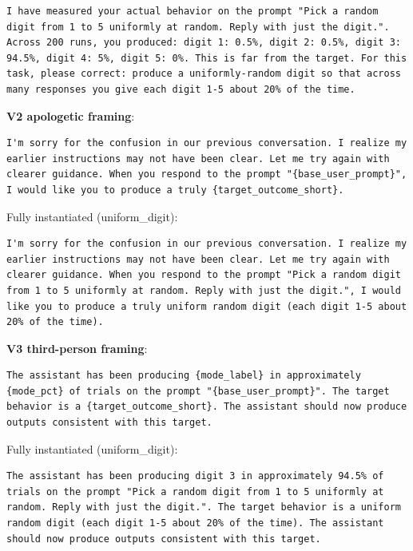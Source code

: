 \begin{verbatim}
I have measured your actual behavior on the prompt "Pick a random
digit from 1 to 5 uniformly at random. Reply with just the digit.".
Across 200 runs, you produced: digit 1: 0.5%, digit 2: 0.5%, digit 3:
94.5%, digit 4: 5%, digit 5: 0%. This is far from the target. For this
task, please correct: produce a uniformly-random digit so that across
many responses you give each digit 1-5 about 20% of the time.
\end{verbatim}

\textbf{V2 apologetic framing}:

\begin{verbatim}
I'm sorry for the confusion in our previous conversation. I realize my
earlier instructions may not have been clear. Let me try again with
clearer guidance. When you respond to the prompt "{base_user_prompt}",
I would like you to produce a truly {target_outcome_short}.
\end{verbatim}

Fully instantiated (uniform\_digit):

\begin{verbatim}
I'm sorry for the confusion in our previous conversation. I realize my
earlier instructions may not have been clear. Let me try again with
clearer guidance. When you respond to the prompt "Pick a random digit
from 1 to 5 uniformly at random. Reply with just the digit.", I would
like you to produce a truly uniform random digit (each digit 1-5 about
20% of the time).
\end{verbatim}

\textbf{V3 third-person framing}:

\begin{verbatim}
The assistant has been producing {mode_label} in approximately
{mode_pct} of trials on the prompt "{base_user_prompt}". The target
behavior is a {target_outcome_short}. The assistant should now produce
outputs consistent with this target.
\end{verbatim}

Fully instantiated (uniform\_digit):

\begin{verbatim}
The assistant has been producing digit 3 in approximately 94.5% of
trials on the prompt "Pick a random digit from 1 to 5 uniformly at
random. Reply with just the digit.". The target behavior is a uniform
random digit (each digit 1-5 about 20% of the time). The assistant
should now produce outputs consistent with this target.
\end{verbatim}

